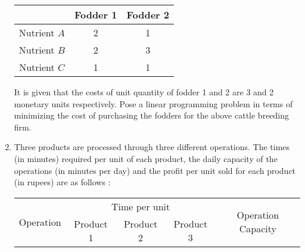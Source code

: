 \documentclass[11pt, a4paper]{article}
\begin{document}
\begin{enumerate}
	\begin{table}[h]
	\def\arraystretch{1.5}
	
	\begin{center}
	\begin{tabular}{|c|c|c|}
	
	\hline
	
	& Fodder 1 & Fodder 2 \\
	
	\hline
	
	Nutrient $A$ & 2 & 1 \\
	
	\hline
	
	Nutrient $B$ & 2 & 3 \\
	
	\hline
	
	Nutrient $C$ & 1 & 1 \\
	
	\hline
	
	\end{tabular}
	\end{center}
	
	\end{table}
	
	It is given that the costs of unit quantity of fodder 1 and 2 are 3 and 2 monetary units respectively. Pose a linear programming problem in terms of minimizing the cost of purchasing the fodders for the above cattle breeding firm.
	
	
	
	
	
	
	

\item Three products are processed through three different operations. The times (in minutes) required per unit of each product, the daily capacity of the operations (in minutes per day) and the profit per unit sold for each product (in rupees) are as follows :

	\begin{table}[h]
	\def\arraystretch{1.5}
	
	\begin{center}
	\begin{tabular}{|c|c|c|c|c|}
	
	\hline
	
	\multirow{2}{*}{Operation} & \multicolumn{3}{c|}{Time per unit} & \multirow{2}{*}{Operation Capacity} \\
	
	\hhline{~---~}
	
	& Product 1 & Product 2 & Product 3 & \\
	

\end{tabular}
\end{center}
\end{table}
\end{enumerate}
\end{document}
